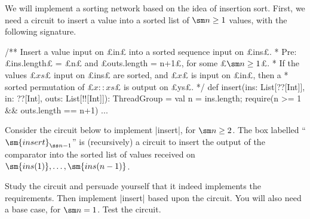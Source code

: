 \begin{question}
We will  implement a sorting network based on the idea of insertion sort.
%
First, we need a circuit to insert a value into a sorted list of
$\sm n \ge 1$ values, with the following signature.
%
\begin{scala}
  /** Insert a value input on £in£ into a sorted sequence input on £ins£. 
    * Pre: £ins.length£ = £n£ and £outs.length = n+1£, for some £$\sm n \ge 1$£.
    * If the values £$xs$£ input on £ins£ are sorted, and £$x$£ is input on £in£, then a
    * sorted permutation of £$x::xs$£ is output on £ys£. */
  def insert(ins: List[??[Int]], in: ??[Int], outs: List[!![Int]]): ThreadGroup = {
    val n = ins.length; require(n >= 1 && outs.length == n+1)
    ...
  }
\end{scala}
%
Consider the circuit below to implement |insert|, for $\sm n \ge 2$.  The box
labelled ``$\sm{insert}_{\ss n-1}$'' is (recursively) a circuit to insert the
output of the comparator into the sorted list of values received on
$\sm{ins(1)}, \ldots, \sm{ins(n-1)}$. %
%
%
\begin{center}
\def\width{6.5} %
\def\recX{2} %
\def\recWidth{3} %
\def\recEnd{\recX+\recWidth} %
\end{center}
%
\begin{qpart}
\label{Q:insert1}
Study the circuit and persuade yourself that it indeed implements the
requirements.  Then implement |insert| based upon the circuit.  You will also
need a base case, for $\sm n = 1$.  Test the circuit.
\end{qpart}


\end{question}
